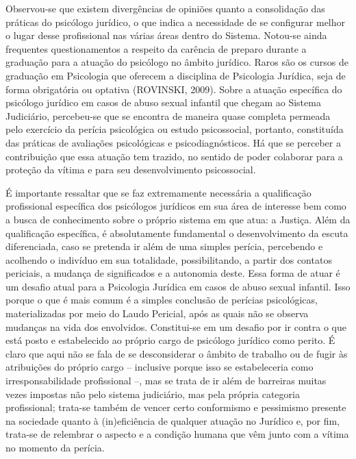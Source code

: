 Observou-se que existem divergências de opiniões quanto a consolidação das práticas do psicólogo jurídico, o que indica a necessidade de se configurar melhor o lugar desse profissional nas várias áreas dentro do Sistema. Notou-se ainda frequentes questionamentos a respeito da carência de preparo durante a graduação para a atuação do psicólogo no âmbito jurídico. Raros são os cursos de graduação em Psicologia que oferecem a disciplina de Psicologia Jurídica, seja de forma obrigatória ou optativa (ROVINSKI, 2009).
Sobre a atuação específica do psicólogo jurídico em casos de abuso sexual infantil que chegam ao Sistema Judiciário, percebeu-se que se encontra de maneira quase completa permeada pelo exercício da perícia psicológica ou estudo psicossocial, portanto, constituída das práticas de avaliações psicológicas e psicodiagnósticos. Há que se perceber a contribuição que essa atuação tem trazido, no sentido de poder colaborar para a proteção da vítima e para seu desenvolvimento psicossocial. 
 
É importante ressaltar que se faz extremamente necessária a qualificação profissional específica dos psicólogos jurídicos em sua área de interesse bem como a busca de conhecimento sobre o próprio sistema em que atua: a Justiça. Além da qualificação específica, é absolutamente fundamental o desenvolvimento da escuta diferenciada, caso se pretenda ir além de uma simples perícia, percebendo e acolhendo o indivíduo em sua totalidade, possibilitando, a partir dos contatos periciais, a mudança de significados e a autonomia deste. Essa forma de atuar é um desafio atual para a Psicologia Jurídica em casos de abuso sexual infantil. Isso porque o que é mais comum é a simples conclusão de perícias psicológicas, materializadas por meio do Laudo Pericial, após as quais não se observa mudanças na vida dos envolvidos. Constitui-se em um desafio por ir contra o que está posto e estabelecido ao próprio cargo de psicólogo jurídico como perito. É claro que aqui não se fala de se desconsiderar o âmbito de trabalho ou de fugir às atribuições do próprio cargo -- inclusive porque isso se estabeleceria como irresponsabilidade profissional --, mas se trata de ir além de barreiras muitas vezes impostas não pelo sistema judiciário, mas pela própria categoria profissional; trata-se também de vencer certo conformismo e pessimismo presente na sociedade quanto à (in)eficiência de qualquer atuação no Jurídico e, por fim, trata-se de relembrar o aspecto e a condição humana que vêm junto com a vítima no momento da perícia.

